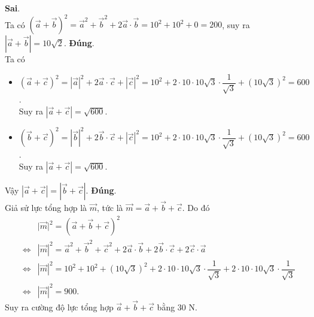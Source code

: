 \begin{ex}
{\begin{itemchoice}
 \itemch \textbf{Sai}.\\
Ta có $\left( \overrightarrow{a} + \overrightarrow{b}\right)^2 = {\overrightarrow{a}}^2 + {\overrightarrow{b}}^2 + 2\overrightarrow{a}\cdot \overrightarrow{b} = 10^2+10^2+0 =200$, suy ra $\left|\overrightarrow{a}+\overrightarrow{b}\right|=10\sqrt{2}$.
 \itemch \textbf{Đúng}.\\
Ta có \begin{itemize}
\item $\left(\overrightarrow{a}+\overrightarrow{c}\right)^2=\left|\overrightarrow{a}\right|^2+2\overrightarrow{a}\cdot\overrightarrow{c}+\left|\overrightarrow{c}\right|^2=10^2+2\cdot 10\cdot 10\sqrt{3}\cdot\dfrac{1}{\sqrt{3}}+\left(10\sqrt{3}\right)^2=600$.\\
Suy ra $\left|\overrightarrow{a}+\overrightarrow{c}\right|=\sqrt{600}$.
\item $\left(\overrightarrow{b}+\overrightarrow{c}\right)^2=\left|\overrightarrow{b}\right|^2+2\overrightarrow{b}\cdot\overrightarrow{c}+\left|\overrightarrow{c}\right|^2=10^2+2\cdot 10\cdot 10\sqrt{3}\cdot\dfrac{1}{\sqrt{3}}+\left(10\sqrt{3}\right)^2=600$.\\
Suy ra $\left|\overrightarrow{a}+\overrightarrow{c}\right|=\sqrt{600}$.
 \end{itemize}
Vậy $\left|\overrightarrow{a}+\overrightarrow{c}\right|=\left|\overrightarrow{b}+\overrightarrow{c}\right|$.
 \itemch \textbf{Đúng}.\\
Giả sử lực tổng hợp là $\overrightarrow{m}$, tức là $\overrightarrow{m}=\overrightarrow{a}+\overrightarrow{b}+\overrightarrow{c}$. Do đó
\begin{eqnarray*}
&& \big|\overrightarrow{m}\big|^2=\left(\overrightarrow{a}+\overrightarrow{b}+\overrightarrow{c}\right)^2\\
&\Leftrightarrow& \left|\overrightarrow{m}\right|^2={\overrightarrow{a}}^2+{\overrightarrow{b}}^2+{\overrightarrow{c}}^2+2\overrightarrow{a}\cdot\overrightarrow{b}+2\overrightarrow{b}\cdot\overrightarrow{c}+2\overrightarrow{c}\cdot\overrightarrow{a}\\
&\Leftrightarrow& \left|\overrightarrow{m}\right|^2=10^2+10^2+(10\sqrt{3})^2+2\cdot 10\cdot10\sqrt{3}\cdot\dfrac{1}{\sqrt{3}}+2\cdot 10\cdot10\sqrt{3}\cdot\dfrac{1}{\sqrt{3}}\\
&\Leftrightarrow& \left|\overrightarrow{m}\right|^2=900.
\end{eqnarray*}
Suy ra cường độ lực tổng hợp $\overrightarrow{a}+\overrightarrow{b}+\overrightarrow{c}$ bằng $30$ N.
\end{itemchoice}
}
\end{ex}

